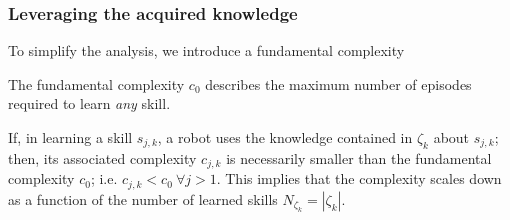 \subsubsection{\textbf{Leveraging the acquired knowledge}}
To simplify the analysis, we introduce a fundamental complexity
\begin{tcolorbox}
\begin{assumption}\label{assumption:fundamental_complexity} The fundamental complexity $c_0$ describes the maximum number of episodes required to learn \emph{any} skill.
\end{assumption}
\end{tcolorbox}
If, in learning a skill $ s_{j,k} $, a robot uses the knowledge contained in $\mathcal{\zeta}_k$ about $s_{j,k}$; then, its associated complexity $ c_{j,k} $ is necessarily smaller than the fundamental complexity $c_{0}$; i.e. $c_{j,k} < c_0~\forall j>1$.
This implies that the complexity scales down as a function of the number of learned skills $N_{\zeta_k}=|\mathcal{\zeta}_k|$.%

